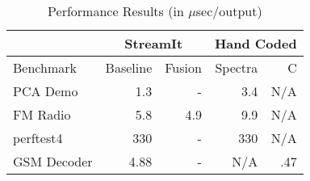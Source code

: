 \begin{table}[t]
\begin{center}
\scriptsize
\begin{tabular}{|l|r|r|r|r|} \hline
& \multicolumn{2}{|c|}{StreamIt} &  \multicolumn{2}{|c|}{Hand Coded}\\
\hline 
Benchmark & Baseline & Fusion & Spectra & C \\
\hline \hline
PCA Demo & 1.3 & - & 3.4 & N/A\\
\hline
FM Radio & 5.8 & 4.9 & 9.9 & N/A\\
\hline
perftest4 & 330 & - & 330 & N/A\\
\hline
GSM Decoder & 4.88 & - & N/A & .47\\
\hline
\end{tabular}
\vspace{-6pt}
\caption{\protect\small Performance Results (in $\mu$sec/output)}
\label{tab:performance}
\vspace{-21pt}
\end{center}
\end{table}





